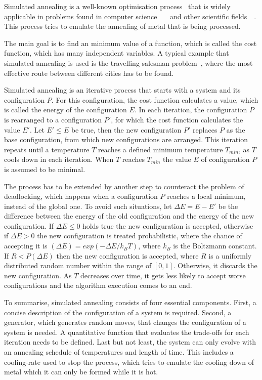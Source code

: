 \documentclass[draft,final]{vutinfth} %
\begin{document}
Simulated annealing is a well-known optimisation process~\cite{kirkpatrick1983optimization} that is widely applicable in problems found in computer science~\cite{goffe1994global}~\cite{dekkers1991global}~\cite{brooks1995optimization} and other scientific fields~\cite{pannetier1990prediction}~\cite{sutter1995automated}. This process tries to emulate the annealing of metal that is being processed.

The main goal is to find an minimum value of a function, which is called the cost function, which has many independent variables. A typical example that simulated annealing is used is the travelling salesman problem~\cite{malek1989serial}, where the most effective route between different cities has to be found. 

Simulated annealing is an iterative process that starts with a system and its configuration $P$. For this configuration, the cost function calculates a value, which is called the energy of the configuration $E$. In each iteration, the configuration $P$ is rearranged to a configuration $P'$, for which the cost function calculates the value $E'$. Let $E' \leq E$ be true, then the new configuration $P'$ replaces $P$ as the base configuration, from which new configurations are arranged. This iteration repeats until a temperature $T$ reaches a defined minimum temperature $T_{min}$, as $T$ cools down in each iteration. When $T$ reaches $T_{min}$ the value $E$ of configuration $P$ is assumed to be minimal.

The process has to be extended by another step to counteract the problem of deadlocking, which happens when a configuration $P$ reaches a local minimum, instead of the global one. To avoid such situations, let $\Delta E = E - E'$ be the difference between the energy of the old configuration and the energy of the new configuration. If $\Delta E \leq 0$ holds true the new configuration is accepted, otherwise if $\Delta E > 0$ the new configuration is treated probabilistic, where the chance of accepting it is $(\Delta E) = exp(-\Delta E / k_B T)$, where $k_B$ is the Boltzmann constant. If $R < P(\Delta E)$ then the new configuration is accepted, where $R$ is a uniformly distributed random number within the range of $[0,1]$. Otherwise, it discards the new configuration. As $T$ decreases over time, it gets less likely to accept worse configurations and the algorithm execution comes to an end.

To summarise, simulated annealing consists of four essential components. First, a concise description of the configuration of a system is required. Second, a generator, which generates random moves, that changes the configuration of a system is needed. A quantitative function that evaluates the trade-offs for each iteration needs to be defined. Last but not least, the system can only evolve with an annealing schedule of temperatures and length of time. This includes a cooling-rate used to stop the process, which tries to emulate the cooling down of metal which it can only be formed while it is hot.
\end{document}
